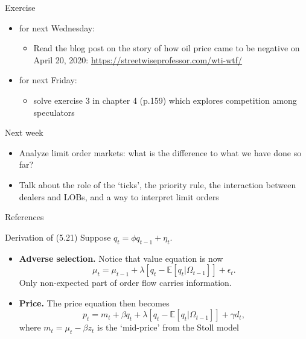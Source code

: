 \documentclass[english,10pt
,aspectratio=169
]{beamer}
\begin{document}
\begin{frame}{Exercise}
\begin{itemize}
	\item for next Wednesday:
	\begin{itemize}
		\item Read the blog post on the story of how oil price came to be negative on April 20, 2020: \url{https://streetwiseprofessor.com/wti-wtf/}
	\end{itemize}
	\item for next Friday:
	\begin{itemize}
		\item solve exercise 3 in chapter 4 (p.159) which explores competition among speculators
	\end{itemize}
\end{itemize}
\end{frame}


\begin{frame}{Next week}
\begin{itemize}
	\item Analyze limit order markets: what is the difference to what we have done so far?
	\item Talk about the role of the `ticks', the priority rule, the interaction between dealers and LOBs, and a way to interpret limit orders
\end{itemize}
\end{frame}




\appendix
\begin{frame}[allowframebreaks]{References}


\end{frame}



\begin{frame}[label=derivation, noframenumbering]{Derivation of (5.21)}
	Suppose $q_t=\phi q_{t-1}+\eta_{t}$. 
	\begin{itemize}
		\item \textbf{Adverse selection.} Notice that value equation is now
		\[
		\mu_t=\mu_{t-1}+\lambda[q_t-\mathbb{E}[q_t|\Omega_{t-1}]]+\epsilon_t.
		\]
		Only non-expected part of order flow carries information. 
		\item \textbf{Price.} The price equation then becomes
		\[
		p_t=m_t+\beta q_t+\lambda[q_t-\mathbb{E}[q_t|\Omega_{t-1}]]+\gamma d_t,
		\]
		where $m_t=\mu_t-\beta z_t$ is the `mid-price' from the Stoll model 
	\end{itemize}
\end{frame}
\end{document}
